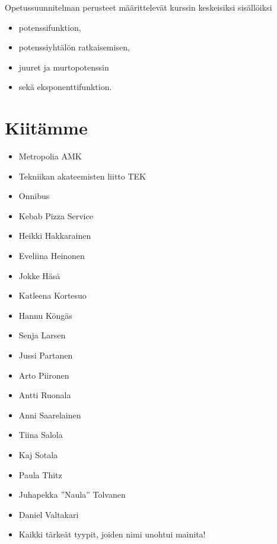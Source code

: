 Opetussuunnitelman perusteet määrittelevät kurssin keskeisiksi sisällöiksi
\begin{itemize}
\item potenssifunktion,
\item potenssiyhtälön ratkaisemisen,
\item juuret ja murtopotenssin
\item sekä eksponenttifunktion.
\end{itemize}

\section*{Kiitämme}
\begin{itemize}
\item Metropolia AMK
\item Tekniikan akateemisten liitto TEK
\item Onnibus
\item Kebab Pizza Service
\item Heikki Hakkarainen
\item Eveliina Heinonen
\item Jokke Häsä
\item Katleena Kortesuo
\item Hannu Köngäs
\item Senja Larsen
\item Jussi Partanen
\item Arto Piironen
\item Antti Ruonala
\item Anni Saarelainen
\item Tiina Salola
\item Kaj Sotala
\item Paula Thitz
\item Juhapekka ''Naula'' Tolvanen
\item Daniel Valtakari
\item Kaikki tärkeät tyypit, joiden nimi unohtui mainita!
\end{itemize}


